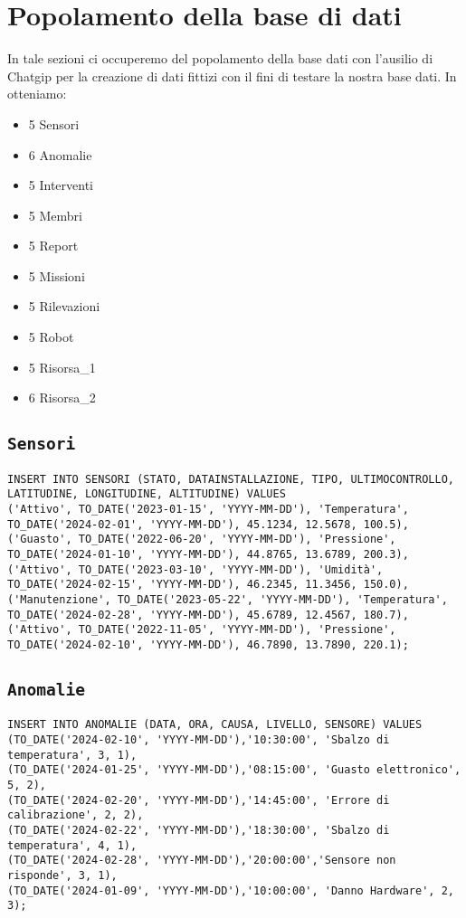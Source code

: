 \section{Popolamento della base di dati}
In tale sezioni ci occuperemo del popolamento della base dati con l'ausilio di Chatgip per la creazione di dati fittizi con il fini di testare la nostra base dati. In otteniamo:
\begin{itemize}
\item 5 Sensori
\item 6 Anomalie
\item 5 Interventi
\item 5 Membri
\item 5 Report
\item 5 Missioni
\item 5 Rilevazioni
\item 5 Robot
\item 5 Risorsa_1
\item 6 Risorsa_2
\end{itemize}
\subsection{\texttt{Sensori}}
\begin{verbatim}
INSERT INTO SENSORI (STATO, DATAINSTALLAZIONE, TIPO, ULTIMOCONTROLLO, LATITUDINE, LONGITUDINE, ALTITUDINE) VALUES
('Attivo', TO_DATE('2023-01-15', 'YYYY-MM-DD'), 'Temperatura', TO_DATE('2024-02-01', 'YYYY-MM-DD'), 45.1234, 12.5678, 100.5),
('Guasto', TO_DATE('2022-06-20', 'YYYY-MM-DD'), 'Pressione', TO_DATE('2024-01-10', 'YYYY-MM-DD'), 44.8765, 13.6789, 200.3),
('Attivo', TO_DATE('2023-03-10', 'YYYY-MM-DD'), 'Umidità', TO_DATE('2024-02-15', 'YYYY-MM-DD'), 46.2345, 11.3456, 150.0),
('Manutenzione', TO_DATE('2023-05-22', 'YYYY-MM-DD'), 'Temperatura', TO_DATE('2024-02-28', 'YYYY-MM-DD'), 45.6789, 12.4567, 180.7),
('Attivo', TO_DATE('2022-11-05', 'YYYY-MM-DD'), 'Pressione', TO_DATE('2024-02-10', 'YYYY-MM-DD'), 46.7890, 13.7890, 220.1);
\end{verbatim}
\subsection{\texttt{Anomalie}}
\begin{verbatim}
INSERT INTO ANOMALIE (DATA, ORA, CAUSA, LIVELLO, SENSORE) VALUES 
(TO_DATE('2024-02-10', 'YYYY-MM-DD'),'10:30:00', 'Sbalzo di temperatura', 3, 1),
(TO_DATE('2024-01-25', 'YYYY-MM-DD'),'08:15:00', 'Guasto elettronico', 5, 2),
(TO_DATE('2024-02-20', 'YYYY-MM-DD'),'14:45:00', 'Errore di calibrazione', 2, 2),
(TO_DATE('2024-02-22', 'YYYY-MM-DD'),'18:30:00', 'Sbalzo di temperatura', 4, 1),
(TO_DATE('2024-02-28', 'YYYY-MM-DD'),'20:00:00','Sensore non risponde', 3, 1),
(TO_DATE('2024-01-09', 'YYYY-MM-DD'),'10:00:00', 'Danno Hardware', 2, 3);
\end{verbatim}
